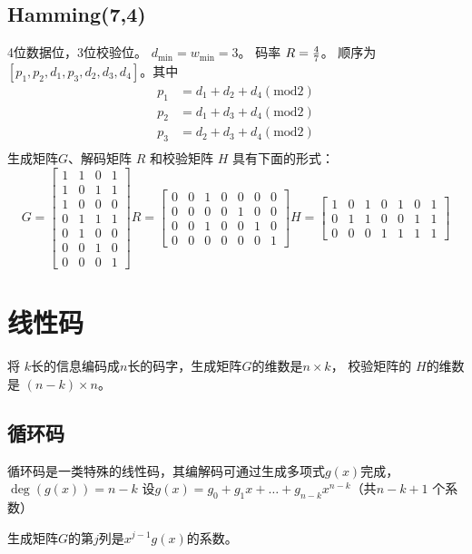 \documentclass{article}
\DeclareMathOperator\degree{\mathrm{deg}}
\begin{document}
\subsection{Hamming(7,4)}
4位数据位，3位校验位。 $d_{\min} = w_{\min} = 3 $。 码率 $ R = {4 \over 7}$。
顺序为 $ [p_1, p_2, d_1, p_3, d_2, d_3, d_4] $。其中 
\begin{align*}
 p_1 & = d_1 + d_2 + d_4 (\mathrm{mod} 2) \\
 p_2 & = d_1 + d_3 + d_4  (\mathrm{mod} 2) \\
 p_3 & = d_2 + d_3 + d_4  (\mathrm{mod} 2) \\
\end{align*}
生成矩阵$G$、解码矩阵 $ R$ 和校验矩阵 $H$ 具有下面的形式：
$$
G = \begin{bmatrix}
1 & 1 & 0 & 1 \\
1 & 0 & 1 & 1 \\
1 & 0 & 0 & 0 \\
0 & 1 & 1 & 1 \\
0 & 1 & 0 & 0 \\
0 & 0 & 1 & 0 \\
0 & 0 & 0 & 1
\end{bmatrix}
R = \begin{bmatrix}
0 & 0 & 1 & 0 & 0 & 0 & 0 \\
0 & 0 & 0 & 0 & 1 & 0 & 0 \\
0 & 0 & 1 & 0 & 0 & 1 & 0 \\
0 & 0 & 0 & 0 & 0 & 0 & 1
\end{bmatrix}
H = \begin{bmatrix}
1 & 0 & 1 & 0 & 1 & 0 & 1 \\
0 & 1 & 1 & 0 & 0 & 1 & 1 \\
0 & 0 & 0 & 1 & 1 & 1 & 1 
\end{bmatrix}
$$
\section{线性码}
将 $k$长的信息编码成$n$长的码字，生成矩阵$G$的维数是$n\times k$， 校验矩阵的
$H$的维数是 $(n-k) \times n$。
\subsection{循环码}
循环码是一类特殊的线性码，其编解码可通过生成多项式$g(x)$完成，$\degree(g(x)) = n-k$
设$g(x) = g_0 + g_1 x + \dots + g_{n-k} x^{n-k} $（共$n-k+1$ 个系数）

生成矩阵$G$的第$j$列是$x^{j-1}g(x)$的系数。
\end{document}
